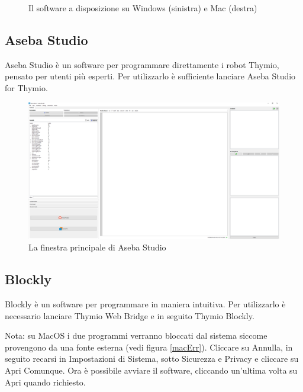 \documentclass[12pt]{article}
\begin{document}
\begin{figure}[h]
\begin{minipage}{0.45\textwidth}
		\end{minipage}
		\caption{Il software a disposizione su Windows (sinistra) e Mac (destra)}
		\label{apps}
	\end{figure}
		
	\subsection{Aseba Studio}
	
		Aseba Studio è un software per programmare direttamente i robot Thymio, pensato per utenti più esperti. Per utilizzarlo è sufficiente lanciare Aseba Studio for Thymio.
		
		\begin{figure}[H]
			\includegraphics[width=\textwidth]{img/asebaConnIta.png}
			\caption{La finestra principale di Aseba Studio}
			\label{aseba1}
		\end{figure}		

	\subsection{Blockly}

		Blockly è un software per programmare in maniera intuitiva. Per utilizzarlo è necessario lanciare Thymio Web Bridge e in seguito Thymio Blockly.
	
		Nota: su MacOS i due programmi verranno bloccati dal sistema siccome provengono da una fonte esterna (vedi figura \ref{macErr}). Cliccare su Annulla, in seguito recarsi in Impostazioni di Sistema, sotto Sicurezza e Privacy e cliccare su Apri Comunque. Ora è possibile avviare il software, cliccando un'ultima volta su Apri quando richiesto.
		
\end{document}

